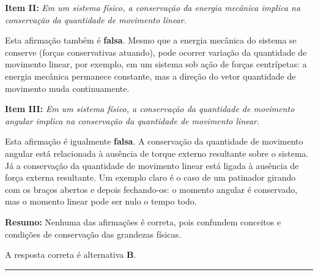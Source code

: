 \begin{flushleft}
\vspace{0.3cm}

\textbf{Item II:} \textit{Em um sistema físico, a conservação da energia mecânica implica na conservação da quantidade de movimento linear.}

Esta afirmação também é \textbf{falsa}.  
Mesmo que a energia mecânica do sistema se conserve (forças conservativas atuando), pode ocorrer variação da quantidade de movimento linear, por exemplo, em um sistema sob ação de forças centrípetas: a energia mecânica permanece constante, mas a direção do vetor quantidade de movimento muda continuamente.

\vspace{0.3cm}

\textbf{Item III:} \textit{Em um sistema físico, a conservação da quantidade de movimento angular implica na conservação da quantidade de movimento linear.}

Esta afirmação é igualmente \textbf{falsa}.  
A conservação da quantidade de movimento angular está relacionada à ausência de torque externo resultante sobre o sistema.  
Já a conservação da quantidade de movimento linear está ligada à ausência de força externa resultante.  
Um exemplo claro é o caso de um patinador girando com os braços abertos e depois fechando-os: o momento angular é conservado, mas o momento linear pode ser nulo o tempo todo.

\vspace{0.3cm}

\textbf{Resumo:}  
Nenhuma das afirmações é correta, pois confundem conceitos e condições de conservação das grandezas físicas.

\vspace{0.3cm}

A resposta correta é alternativa \colorbox{green!50}{\textbf{B}}.

\end{flushleft}

\noindent\rule{\linewidth}{0.6pt}\\


